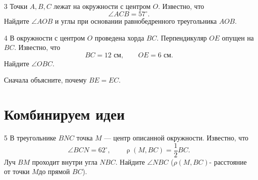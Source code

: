 \begin{homeworktask}{3}
Точки \(A,B,C\) лежат на окружности с центром \(O\). Известно, что
\[
\angle ACB=57^\circ.
\]
Найдите \(\angle AOB\) и углы при основании равнобедренного треугольника
\(AOB\).
\noindent
\begin{minipage}[t]{0.43\linewidth}
\drawingbox[36mm]
\end{minipage}\hfill
\begin{minipage}[t]{0.53\linewidth}
\answerline[3]
\end{minipage}
\end{homeworktask}

\newpage
\begin{homeworktask}{4}
В окружности с центром \(O\) проведена хорда \(BC\). Перпендикуляр
\(OE\) опущен на \(BC\). Известно, что
\[
BC=12\text{ см},
\qquad
OE=6\text{ см}.
\]
Найдите \(\angle OBC\).

\begin{hintbox}
Сначала объясните, почему \(BE=EC\).
\end{hintbox}
\noindent
\begin{minipage}[t]{0.43\linewidth}
\drawingbox[35mm]
\end{minipage}\hfill
\begin{minipage}[t]{0.53\linewidth}
\answerline[3]
\end{minipage}
\end{homeworktask}

\section{Комбинируем идеи}

\begin{homeworktask}{5}
В треугольнике \(BNC\) точка \(M\) — центр описанной окружности.
Известно, что
\[
\angle BCN=62^\circ,
\qquad
\operatorname{\rho}(M,BC)=\frac12BC.
\]
Луч \(BM\) проходит внутри угла \(NBC\). Найдите \(\angle NBC\) (\(\rho(M,BC)\)- расстояние от точки \(M\)до прямой \(BC\)).


\noindent
\begin{minipage}[t]{0.43\linewidth}
\drawingbox[42mm]
\end{minipage}\hfill
\begin{minipage}[t]{0.53\linewidth}
\answerline[4]
\end{minipage}
\end{homeworktask}

